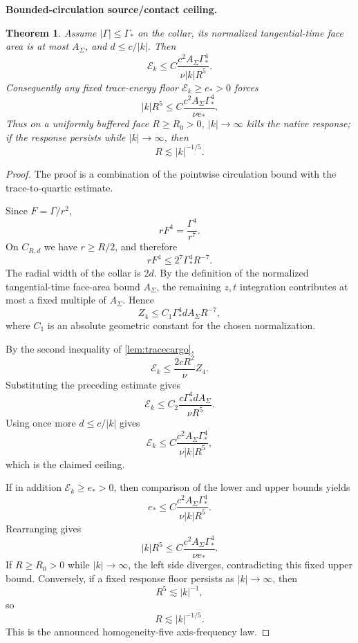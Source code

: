 \documentclass[11pt]{article}
\newtheorem{theorem}{Theorem}[section]
\theoremstyle{definition}\newtheorem{definition}[theorem]{Definition}
\theoremstyle{remark}\newtheorem{remark}[theorem]{Remark}
\begin{document}
\medskip
\noindent\textbf{Bounded-circulation source/contact ceiling.}
\begin{theorem}\label{thm:sourcecontact}
Assume $|\Gamma|\le\Gamma_*$ on the collar, its normalized tangential-time face area is at most $A_\Sigma$, and $d\le c/|k|$. Then
\[
\boxed{
\mathcal E_k\le C\frac{c^2A_\Sigma\Gamma_*^4}{\nu|k|R^5}.
}
\]
Consequently any fixed trace-energy floor $\mathcal E_k\ge e_*>0$ forces
\[
\boxed{|k|R^5\le C\frac{c^2A_\Sigma\Gamma_*^4}{\nu e_*}.}
\]
Thus on a uniformly buffered face $R\ge R_0>0$, $|k|\to\infty$ kills the native response; if the response persists while $|k|\to\infty$, then
\[
\boxed{R\lesssim |k|^{-1/5}.}
\]
\end{theorem}
\begin{proof}
The proof is a combination of the pointwise circulation bound with the trace-to-quartic estimate.

Since $F=\Gamma/r^2$,
\[
 rF^4=\frac{\Gamma^4}{r^7}.
\]
On $C_{R,d}$ we have $r\ge R/2$, and therefore
\[
 rF^4\le 2^7\Gamma_*^4R^{-7}.
\]
The radial width of the collar is $2d$.  By the definition of the normalized tangential-time face-area bound $A_\Sigma$, the remaining $z,t$ integration contributes at most a fixed multiple of $A_\Sigma$.  Hence
\[
 Z_4
 \le C_1\Gamma_*^4 d A_\Sigma R^{-7},
\]
where $C_1$ is an absolute geometric constant for the chosen normalization.

By the second inequality of \cref{lem:tracecargo},
\[
 \mathcal E_k
 \le \frac{2cR^2}{\nu}Z_4.
\]
Substituting the preceding estimate gives
\[
 \mathcal E_k
 \le C_2\frac{c\Gamma_*^4dA_\Sigma}{\nu R^5}.
\]
Using once more $d\le c/|k|$ gives
\[
 \mathcal E_k
 \le C\frac{c^2A_\Sigma\Gamma_*^4}{\nu|k|R^5},
\]
which is the claimed ceiling.

If in addition $\mathcal E_k\ge e_*>0$, then comparison of the lower and upper bounds yields
\[
 e_*
 \le C\frac{c^2A_\Sigma\Gamma_*^4}{\nu|k|R^5}.
\]
Rearranging gives
\[
 |k|R^5
 \le C\frac{c^2A_\Sigma\Gamma_*^4}{\nu e_*}.
\]
If $R\ge R_0>0$ while $|k|\to\infty$, the left side diverges, contradicting this fixed upper bound.  Conversely, if a fixed response floor persists as $|k|\to\infty$, then
\[
 R^5\lesssim |k|^{-1},
\]
so
\[
 R\lesssim |k|^{-1/5}.
\]
This is the announced homogeneity-five axis-frequency law.
\end{proof}
\end{document}
